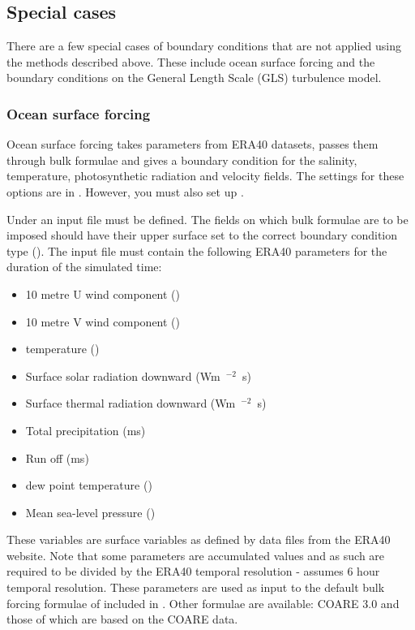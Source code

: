 \subsection{Special cases}\label{sec:BCs:special}

There are a few special cases of boundary conditions that are not applied
using the methods described above.  These include ocean surface forcing and
the boundary conditions on the General Length Scale (GLS) turbulence model.

\subsubsection{Ocean surface forcing}\label{sec:BCs:special:oceans}

Ocean surface forcing takes parameters from ERA40 datasets, passes them
through bulk formulae and gives a boundary condition for the salinity,
temperature, photosynthetic radiation and velocity fields. The settings for
these options are in . However, you must also set up
.

Under  an input file must be defined. The fields on 
which bulk formulae are to be imposed should have their upper surface set to the correct
boundary condition type ().
The input file must contain the following ERA40 parameters for the
duration of the simulated time:
\begin{itemize}
 \item 10 metre U wind component (\ms)
 \item 10 metre V wind component (\ms)
 \item \m[2] temperature (\K)
 \item Surface solar radiation downward (\unit{Wm\ensuremath{^{-2}}s})
 \item Surface thermal radiation downward (\unit{Wm\ensuremath{^{-2}}s})
 \item Total precipitation (\unit{ms})
 \item Run off (\unit{ms})
 \item \m[2] dew point temperature (\K)
 \item Mean sea-level pressure (\Pa)
\end{itemize}

These variables are surface variables as defined by data files from the ERA40 website. Note that some parameters are accumulated values
and as such are required to be divided by the ERA40 temporal resolution - \fluidity { } assumes 6 hour temporal resolution. 
These parameters are used as input to the default bulk forcing formulae of \citet{large2004} included in \fluidity. Other
formulae are available: COARE 3.0 \citep{fairall2003} and those of \citet{kara2005} which are based on the COARE data.

